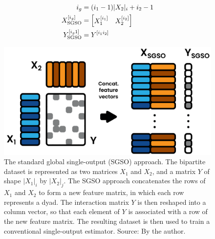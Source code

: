 %
\begin{equation}  %
    \begin{split}
    i_g &= (i_1-1)|X_2|_i+i_2-1\\
    X_\text{SGSO} \el{i_g} &= \begin{bmatrix} X_1 \el{i_1} & X_2\el{i_2}\end{bmatrix}\\
    Y_\text{SGSO} \el{i_g1} &= Y\el{i_1i_2}
    \end{split}
    \label{eq:gsodata}
\end{equation}

\begin{figure}[tb]
    \centering
    \includegraphics[width=.5\textwidth]{figures/gso.pdf}
    \caption{
        The standard global single-output (SGSO) approach. The bipartite dataset is represented as two matrices $X_1$ and $X_2$, and a matrix $Y$ of shape $|X_1|_i$ by $|X_2|_j$. The SGSO approach concatenates the rows of $X_1$ and $X_2$ to form a new feature matrix, in which each row represents a dyad. The interaction matrix $Y$ is then reshaped into a column vector, so that each element of $Y$ is associated with a row of the new feature matrix. The resulting dataset is then used to train a conventional single-output estimator.
        \newline Source: By the author.
    }
    \label{fig:sgso}
\end{figure}


